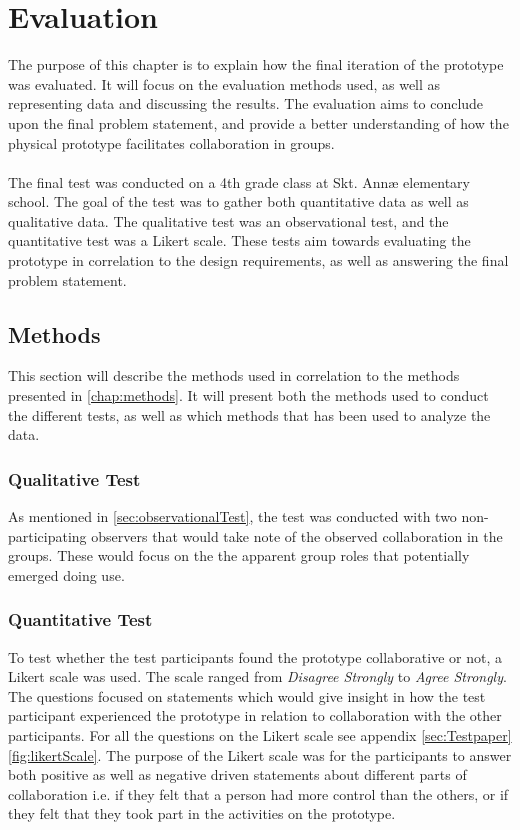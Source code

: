 \chapter{Evaluation}\label{evaluation}

The purpose of this chapter is to explain how the final iteration of the prototype was evaluated. It will focus on the evaluation methods used, as well as representing data and discussing the results. The evaluation aims to conclude upon the final problem statement, and provide a better understanding of how the physical prototype facilitates collaboration in groups.\\\\

The final test was conducted on a 4th grade class at Skt. Annæ elementary school. The goal of the test was to gather both quantitative data as well as qualitative data. The qualitative test was an observational test, and the quantitative test was a Likert scale. These tests aim towards evaluating the prototype in correlation to the design requirements, as well as answering the final problem statement.

\section{Methods}
This section will describe the methods used in correlation to the methods presented in \autoref{chap:methods}. It will present both the methods used to conduct the different tests, as well as which methods that has been used to analyze the data.

\subsection{Qualitative Test}
As mentioned in \autoref{sec:observationalTest}, the test was conducted with two non-participating observers that would take note of the observed collaboration in the groups. These would focus on the the apparent group roles that potentially emerged doing use. 


\subsection{Quantitative Test}
To test whether the test participants found the prototype collaborative or not, a Likert scale was used. The scale ranged from \textit{Disagree Strongly} to \textit{Agree Strongly}. The questions focused on statements which would give insight in how the test participant experienced the prototype in relation to collaboration with the other participants. For all the questions on the Likert scale see appendix \ref{sec:Testpaper} \ref{fig:likertScale}. The purpose of the Likert scale was for the participants to answer both positive as well as negative driven statements about different parts of collaboration i.e. if they felt that a person had more control than the others, or if they felt that they took part in the activities on the prototype.\\\\

